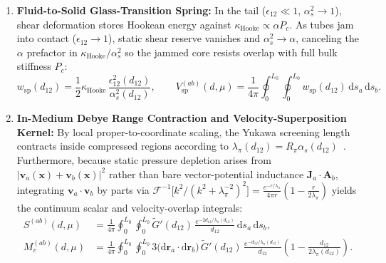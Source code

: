 \documentclass[11pt, a4paper]{article}
\DeclareRobustCommand{\dd}{\mathrm{d}}
\begin{document}
\begin{enumerate}[leftmargin=1.8em, itemsep=2pt]
    \item \textbf{Fluid-to-Solid Glass-Transition Spring:} In the tail ($\epsilon_{12} \ll 1$, $\alpha_s^2 \to 1$), shear deformation stores Hookean energy against $\kappa_{\mathrm{Hooke}} \propto \alpha P_c$. As tubes jam into contact ($\epsilon_{12} \to 1$), static shear reserve vanishes and $\alpha_s^2 \to \alpha$, canceling the $\alpha$ prefactor in $\kappa_{\mathrm{Hooke}}/\alpha_s^2$ so the jammed core resists overlap with full bulk stiffness $P_c$:
    \begin{equation}
        w_{\mathrm{sp}}(d_{12}) = \frac{1}{2}\kappa_{\mathrm{Hooke}}\,\frac{\epsilon_{12}^2(d_{12})}{\alpha_s^2(d_{12})}, \qquad
        V_{\mathrm{sp}}^{(ab)}(d, \mu) = \frac{1}{4\pi}\oint_0^{L_0}\!\!\oint_0^{L_0} w_{\mathrm{sp}}(d_{12})\,\dd s_a\,\dd s_b.
        \label{eq:hookean_spring_kernel}
    \end{equation}
    \item \textbf{In-Medium Debye Range Contraction and Velocity-Superposition Kernel:} By local proper-to-coordinate scaling, the Yukawa screening length contracts inside compressed regions according to $\lambda_\pi(d_{12}) = R_\pi\alpha_s(d_{12})$~\cite{bairmosheh2026}. Furthermore, because static pressure depletion arises from $|\mathbf{v}_a(\mathbf{x}) + \mathbf{v}_b(\mathbf{x})|^2$ rather than bare vector-potential inductance $\mathbf{J}_a\cdot\mathbf{A}_b$, integrating $\mathbf{v}_a\cdot\mathbf{v}_b$ by parts via $\mathcal{F}^{-1}\!\big[k^2/(k^2 + \lambda_\pi^{-2})^2\big] = \frac{e^{-r/\lambda_\pi}}{4\pi r}(1 - \frac{r}{2\lambda_\pi})$ yields the continuum scalar and velocity-overlap integrals:
    \begin{align}
        S^{(ab)}(d, \mu) &= \frac{1}{4\pi}\oint_0^{L_0}\!\!\oint_0^{L_0} \widetilde{G}'(d_{12})\,\frac{e^{-2d_{12}/\lambda_\pi(d_{12})}}{d_{12}}\,\dd s_a\,\dd s_b, \label{eq:debye_scalar_kernel}\\
        M_v^{(ab)}(d, \mu) &= \frac{1}{4\pi}\oint_0^{L_0}\!\!\oint_0^{L_0} 3\big(\dd\mathbf{r}_a\cdot\dd\mathbf{r}_b\big)\,\widetilde{G}'(d_{12})\,\frac{e^{-d_{12}/\lambda_\pi(d_{12})}}{d_{12}}\left(1 - \frac{d_{12}}{2\lambda_\pi(d_{12})}\right). \label{eq:velocity_overlap_kernel}
    \end{align}
\end{enumerate}
\end{document}
